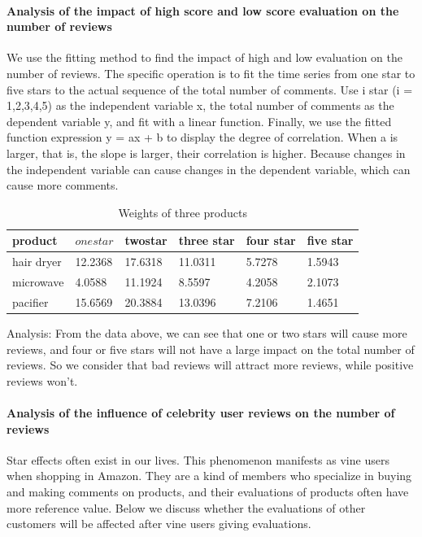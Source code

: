 \documentclass[13pt]{ctexart}
\begin{document}
\paragraph{Analysis of the impact of high score and low score evaluation on the number of reviews}
We use the fitting method to find the impact of high and low evaluation on the number of reviews. The specific operation is to fit the time series from one star to five stars to the actual sequence of the total number of comments. Use i star (i = 1,2,3,4,5) as the independent variable x, the total number of comments as the dependent variable y, and fit with a linear function. Finally, we use the fitted function expression y = ax + b to display the degree of correlation. When a is larger, that is, the slope is larger, their correlation is higher. Because changes in the independent variable can cause changes in the dependent variable, which can cause more comments.
\begin{table}[htbp] %
\caption{Weights of three products}  
	\centering
	\begin{tabular}{p{}<{\centering}p{}<{\centering}p{}<{\centering} p{}<{\centering}p{}<{\centering}p{}<{\centering}} 
		\toprule[1.5pt]
	product  &$ one star$ & twostar  &  three star&four star&five star\\ 
		\midrule 
	hair dryer &12.2368&17.6318&11.0311&5.7278&1.5943\\
	microwave	&4.0588&11.1924&8.5597&4.2058&2.1073\\
	pacifier 	&15.6569&20.3884&13.0396&7.2106&1.4651\\
		\bottomrule[1.5pt] 
	\end{tabular} 
\end{table}
Analysis: From the data above, we can see that one or two stars will cause more reviews, and four or five stars will not have a large impact on the total number of reviews. So we consider that bad reviews will attract more reviews, while positive reviews won't.


\paragraph{Analysis of the influence of celebrity user reviews on the number of reviews}
Star effects often exist in our lives. This phenomenon manifests as vine users when shopping in Amazon. They are a kind of members who specialize in buying and making comments on products, and their evaluations of products often have more reference value. Below we discuss whether the evaluations of other customers will be affected after vine users giving evaluations.
\end{document}
